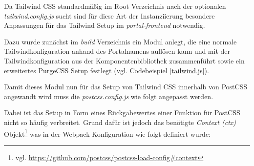 Da Tailwind CSS standardmäßig im Root Verzeichnis nach der optionalen \textit{tailwind.config.js} sucht sind für diese Art der Instanziierung besondere Anpassungen für das Tailwind Setup im \textit{portal-frontend} notwendig.

Dazu wurde zunächst im \textit{build} Verzeichnis ein Modul anlegt, die eine normale Tailwindkonfiguration anhand des Portalnamens auflösen kann und mit der Tailwindkonfiguration aus der Komponentenbibliothek zusammenführt sowie ein erweitertes PurgeCSS Setup festlegt (vgl. Codebeispiel \ref{tailwind.js}).



Damit dieses Modul nun für das Setup von Tailwind CSS innerhalb von PostCSS angewandt wird muss die \textit{postcss.config.js} wie folgt angepasst werden.



Dabei ist das Setup in Form eines Rückgabewertes einer Funktion für PostCSS nicht so häufig verbreitet. Grund dafür ist jedoch das benötigte \textit{Context (ctx)} Objekt\footnote{vgl. \url{https://github.com/postcss/postcss-load-config\#context}} was in der Webpack Konfiguration wie folgt definiert wurde:

